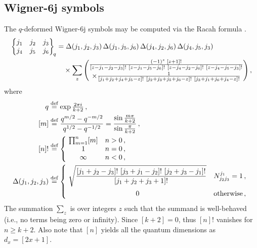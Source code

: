 \subsection{\texorpdfstring{Wigner-6j symbols}{Wigner-6j symbols}}
\label{app:Wigner6j}
The $q$-deformed Wigner-6j symbols may be computed via the Racah formula \cite{Reshetikhin1988}.
\begin{align}\begin{split}
	\Wsixj{j_1 & j_2 & j_3}{j_4 & j_5 & j_6}
	&= \Delta(j_1,j_2,j_3) \, \Delta(j_1,j_5,j_6) \, \Delta(j_4,j_2,j_6) \, \Delta(j_4,j_5,j_3)
	\\	&\quad
		\times \sum_z \begin{pmatrix}
				\frac{ (-1)^z \; [z+1]! }{ [z-j_1-j_2-j_3]! \ [z-j_1-j_5-j_6]! \ [z-j_4-j_2-j_6]! \ [z-j_4-j_5-j_3]! }
			\\[1ex]	\times
				\frac{1}{ [j_1+j_2+j_4+j_5-z]! \ [j_2+j_3+j_5+j_6-z]! \ [j_3+j_1+j_6+j_4-z]! }
			\end{pmatrix} ,
	\label{eq:def_W6j}
\end{split}\end{align}
where
\begin{align}\begin{split}
	q &\mathrel{\overset{\textrm{def}}{=}} \exp\tfrac{2 \pi i}{k+2} \,,
\\	[m] &\mathrel{\overset{\textrm{def}}{=}} \frac{q^{m/2} - q^{-m/2}}{q^{1/2} - q^{-1/2}}
		= \frac{\sin \frac{m\pi}{k+2}}{\sin \frac{\pi}{k+2}} \,,
\\	[n]! &\mathrel{\overset{\textrm{def}}{=}} \left\{ \! \begin{array}{cl}
			\prod_{m=1}^n [m]  &  n > 0 \,,
		\\	1  &  n = 0 \,,
		\\	\infty  &  n < 0 \,,
		\end{array} \right.
\\	\Delta(j_1, j_2, j_3) &\mathrel{\overset{\textrm{def}}{=}} \left\{ \! \begin{array}{cl}
		\sqrt{\dfrac{ [j_1+j_2-j_3]! \ [j_3+j_1-j_2]! \ [j_2+j_3-j_1]! }{ [j_1+j_2+j_3+1]! }}	&	N^{j_1}_{j_2 j_3} = 1 \,, \\[3ex]
		0	&	\text{otherwise} \,, \end{array} \right.
\end{split}\end{align}
The summation $\sum_z$ is over integers $z$ such that the summand is well-behaved (i.e., no terms being zero or infinity).
Since $[k+2] = 0$, thus $[n]!$ vanishes for $n \geq k+2$.
Also note that $[n]$ yields all the quantum dimensions as $d_x = [2x+1]$.

